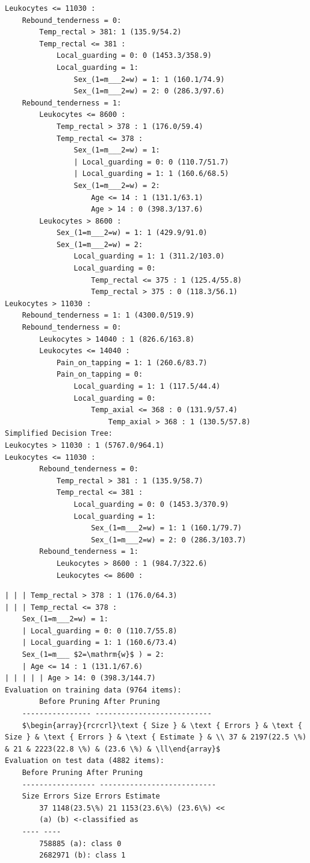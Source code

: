 \documentclass[10pt]{book}
\begin{document}
\begin{verbatim}
Leukocytes <= 11030 :
    Rebound_tenderness = 0:
        Temp_rectal > 381: 1 (135.9/54.2)
        Temp_rectal <= 381 :
            Local_guarding = 0: 0 (1453.3/358.9)
            Local_guarding = 1:
                Sex_(1=m___2=w) = 1: 1 (160.1/74.9)
                Sex_(1=m___2=w) = 2: 0 (286.3/97.6)
    Rebound_tenderness = 1:
        Leukocytes <= 8600 :
            Temp_rectal > 378 : 1 (176.0/59.4)
            Temp_rectal <= 378 :
                Sex_(1=m___2=w) = 1:
                | Local_guarding = 0: 0 (110.7/51.7)
                | Local_guarding = 1: 1 (160.6/68.5)
                Sex_(1=m___2=w) = 2:
                    Age <= 14 : 1 (131.1/63.1)
                    Age > 14 : 0 (398.3/137.6)
        Leukocytes > 8600 :
            Sex_(1=m___2=w) = 1: 1 (429.9/91.0)
            Sex_(1=m___2=w) = 2:
                Local_guarding = 1: 1 (311.2/103.0)
                Local_guarding = 0:
                    Temp_rectal <= 375 : 1 (125.4/55.8)
                    Temp_rectal > 375 : 0 (118.3/56.1)
Leukocytes > 11030 :
    Rebound_tenderness = 1: 1 (4300.0/519.9)
    Rebound_tenderness = 0:
        Leukocytes > 14040 : 1 (826.6/163.8)
        Leukocytes <= 14040 :
            Pain_on_tapping = 1: 1 (260.6/83.7)
            Pain_on_tapping = 0:
                Local_guarding = 1: 1 (117.5/44.4)
                Local_guarding = 0:
                    Temp_axial <= 368 : 0 (131.9/57.4)
                        Temp_axial > 368 : 1 (130.5/57.8)
Simplified Decision Tree:
Leukocytes > 11030 : 1 (5767.0/964.1)
Leukocytes <= 11030 :
        Rebound_tenderness = 0:
            Temp_rectal > 381 : 1 (135.9/58.7)
            Temp_rectal <= 381 :
                Local_guarding = 0: 0 (1453.3/370.9)
                Local_guarding = 1:
                    Sex_(1=m___2=w) = 1: 1 (160.1/79.7)
                    Sex_(1=m___2=w) = 2: 0 (286.3/103.7)
        Rebound_tenderness = 1:
            Leukocytes > 8600 : 1 (984.7/322.6)
            Leukocytes <= 8600 :
\end{verbatim}

\begin{verbatim}
| | | Temp_rectal > 378 : 1 (176.0/64.3)
| | | Temp_rectal <= 378 :
    Sex_(1=m___2=w) = 1:
    | Local_guarding = 0: 0 (110.7/55.8)
    | Local_guarding = 1: 1 (160.6/73.4)
    Sex_(1=m___ $2=\mathrm{w}$ ) = 2:
    | Age <= 14 : 1 (131.1/67.6)
| | | | | Age > 14: 0 (398.3/144.7)
Evaluation on training data (9764 items):
        Before Pruning After Pruning
    ---------------- ---------------------------
    $\begin{array}{rcrcrl}\text { Size } & \text { Errors } & \text { Size } & \text { Errors } & \text { Estimate } & \\ 37 & 2197(22.5 \%) & 21 & 2223(22.8 \%) & (23.6 \%) & \ll\end{array}$
Evaluation on test data (4882 items):
    Before Pruning After Pruning
    ----------------- ---------------------------
    Size Errors Size Errors Estimate
        37 1148(23.5\%) 21 1153(23.6\%) (23.6\%) <<
        (a) (b) <-classified as
    ---- ----
        758885 (a): class 0
        2682971 (b): class 1
\end{verbatim}
\end{document}
